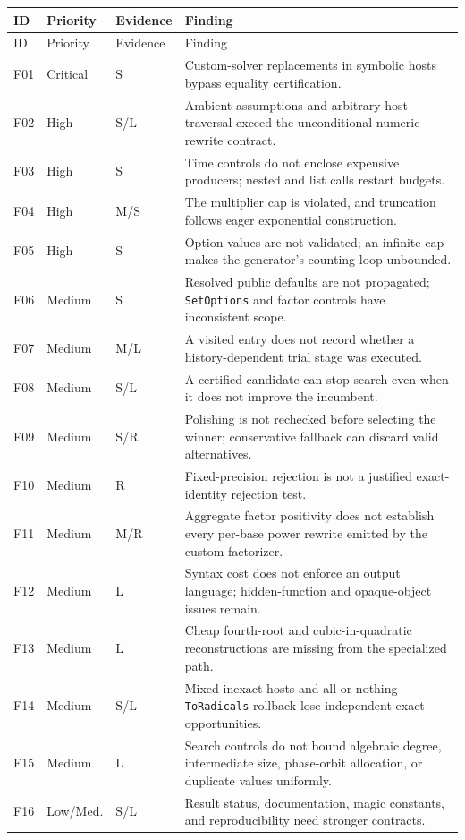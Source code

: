 \documentclass[11pt,letterpaper]{article}
\newcommand{\code}[1]{\texttt{#1}}
\theoremstyle{definition}
\begin{document}
\begin{longtable}{@{}p{}p{}p{}p{}@{}}
\toprule ID & Priority & Evidence & Finding\\\midrule
\endfirsthead
\toprule ID & Priority & Evidence & Finding\\\midrule\endhead
\bottomrule\endfoot
F01 & Critical & S & Custom-solver replacements in symbolic hosts bypass equality certification.\\
F02 & High & S/L & Ambient assumptions and arbitrary host traversal exceed the unconditional numeric-rewrite contract.\\
F03 & High & S & Time controls do not enclose expensive producers; nested and list calls restart budgets.\\
F04 & High & M/S & The multiplier cap is violated, and truncation follows eager exponential construction.\\
F05 & High & S & Option values are not validated; an infinite cap makes the generator's counting loop unbounded.\\
F06 & Medium & S & Resolved public defaults are not propagated; \code{SetOptions} and factor controls have inconsistent scope.\\
F07 & Medium & M/L & A visited entry does not record whether a history-dependent trial stage was executed.\\
F08 & Medium & S/L & A certified candidate can stop search even when it does not improve the incumbent.\\
F09 & Medium & S/R & Polishing is not rechecked before selecting the winner; conservative fallback can discard valid alternatives.\\
F10 & Medium & R & Fixed-precision rejection is not a justified exact-identity rejection test.\\
F11 & Medium & M/R & Aggregate factor positivity does not establish every per-base power rewrite emitted by the custom factorizer.\\
F12 & Medium & L & Syntax cost does not enforce an output language; hidden-function and opaque-object issues remain.\\
F13 & Medium & L & Cheap fourth-root and cubic-in-quadratic reconstructions are missing from the specialized path.\\
F14 & Medium & S/L & Mixed inexact hosts and all-or-nothing \code{ToRadicals} rollback lose independent exact opportunities.\\
F15 & Medium & L & Search controls do not bound algebraic degree, intermediate size, phase-orbit allocation, or duplicate values uniformly.\\
F16 & Low/Med. & S/L & Result status, documentation, magic constants, and reproducibility need stronger contracts.\\
\end{longtable}
\end{document}
